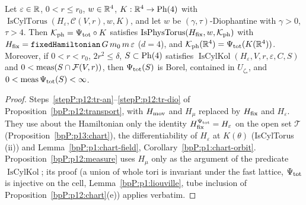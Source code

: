 \begin{proposition}\label{bpP:p13:transport}
Let $\varepsilon\in\mathbb{R}$, $0<r\le r_0$, $w\in\mathbb{R}^4$, $K:\mathbb{R}^4\to\mathrm{Ph}(4)$ with $\operatorname{IsCylTorus}(H_\varepsilon,\mathcal C(V,r),w,K)$, and let $w$ be $(\gamma,\tau)$-Diophantine with $\gamma>0$, $\tau>4$. Then $\mathcal K_{\rm ph}=\Psi_{\rm tot}\circ K$ satisfies $\operatorname{IsPhysTorus}(H_{\rm fix},w,\mathcal K_{\rm ph})$ with $H_{\rm fix}=\texttt{fixedHamiltonian}\,G\,m_0\,m\,\varepsilon$ ($d=4$), and $\mathcal K_{\rm ph}(\mathbb{R}^4)=\Psi_{\rm tot}(K(\mathbb{R}^4))$. Moreover, if $0<r<r_0$, $2r^2\le\delta$, $S\subset\mathrm{Ph}(4)$ satisfies $\operatorname{IsCylKol}(H_\varepsilon,V,r,\varepsilon,C,S)$ and $0<\operatorname{meas}(S\cap\mathcal F(V,r))$, then $\Psi_{\rm tot}(S)$ is Borel, contained in $U_{\zeta_*}$, and $0<\operatorname{meas}\Psi_{\rm tot}(S)<\infty$.
\end{proposition}
\begin{proof}
\label{stepP:p13:tr-torus} Steps~\ref{stepP:p12:tr-an}--\ref{stepP:p12:tr-dio} of Proposition~\ref{bpP:p12:transport}, with $H_{\rm mov}$ and $H_\mu$ replaced by $H_{\rm fix}$ and $H_\varepsilon$. They use about the Hamiltonian only the identity $H_{\rm fix}^{\Psi_{\rm tot}}=H_\varepsilon$ on the open set $\mathcal T$ (Proposition~\ref{bpP:p13:chart}), the differentiability of $H_\varepsilon$ at $K(\theta)$ (IsCylTorus (ii)) and Lemma~\ref{bpP:p1:chart-field}, Corollary~\ref{bpP:p1:chart-orbit}.
\label{stepP:p13:tr-meas} Proposition~\ref{bpP:p12:measure} uses $H_\mu$ only as the argument of the predicate $\operatorname{IsCylKol}$; its proof (a union of whole tori is invariant under the fast lattice, $\Psi_{\rm tot}$ is injective on the cell, Lemma~\ref{bpP:p1:liouville}, tube inclusion of Proposition~\ref{bpP:p12:chart}(e)) applies verbatim.
\end{proof}

